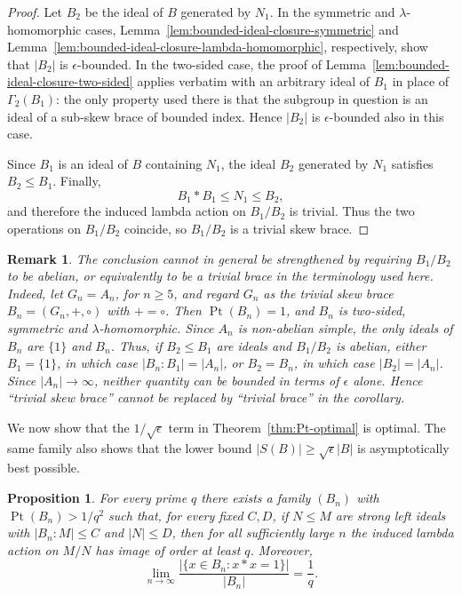 \documentclass[11pt, oneside]{amsart}
\numberwithin{equation}{section}
\theoremstyle{plain}
\newtheorem{pro}[equation]{Proposition}
\newtheorem{rem}[equation]{Remark}
\theoremstyle{definition}
\newcommand{\Pt}{\operatorname{Pt} }
\begin{document}
\begin{proof}
Let $B_2$ be the ideal of $B$ generated by $N_1$. In the symmetric and $\lambda$-homomorphic cases, Lemma~\ref{lem:bounded-ideal-closure-symmetric} and Lemma~\ref{lem:bounded-ideal-closure-lambda-homomorphic}, respectively, show that $|B_2|$ is $\epsilon$-bounded. In the two-sided case, the proof of Lemma~\ref{lem:bounded-ideal-closure-two-sided} applies verbatim with an arbitrary ideal of $B_1$ in place of $\Gamma_2(B_1)$: the only property used there is that the subgroup in question is an ideal of a sub-skew brace of bounded index. Hence $|B_2|$ is $\epsilon$-bounded also in this case.

Since $B_1$ is an ideal of $B$ containing $N_1$, the ideal $B_2$ generated by $N_1$ satisfies $B_2\leqslant B_1$. Finally,
$$
B_1*B_1\leqslant N_1\leqslant B_2,
$$
and therefore the induced lambda action on $B_1/B_2$ is trivial. Thus the two operations on $B_1/B_2$ coincide, so $B_1/B_2$ is a trivial skew brace.
\end{proof}

\begin{rem}
The conclusion cannot in general be strengthened by requiring $B_1/B_2$ to be abelian, or equivalently to be a trivial brace in the terminology used here. Indeed, let $G_n=A_n$, for $n\geqslant5$, and regard $G_n$ as the trivial skew brace $B_n=(G_n,+,\circ)$ with $+=\circ$. Then $\Pt(B_n)=1$, and $B_n$ is two-sided, symmetric and $\lambda$-homomorphic. Since $A_n$ is non-abelian simple, the only ideals of $B_n$ are $\{1\}$ and $B_n$. Thus, if $B_2\leqslant B_1$ are ideals and $B_1/B_2$ is abelian, either $B_1=\{1\}$, in which case $|B_n:B_1|=|A_n|$, or $B_2=B_n$, in which case $|B_2|=|A_n|$. Since $|A_n|\to\infty$, neither quantity can be bounded in terms of $\epsilon$ alone. Hence ``trivial skew brace'' cannot be replaced by ``trivial brace'' in the corollary.
\end{rem}



We now show that the $1/\sqrt{\epsilon}$ term in
Theorem~\ref{thm:Pt-optimal} is optimal. The same family also shows
that the lower bound $|S(B)|\geqslant\sqrt{\epsilon}|B|$ is
asymptotically best possible.

\begin{pro} %
For every prime $q$ there exists a family $(B_n)$ with
$\Pt(B_n)>1/q^2$ such that, for every fixed $C,D$, if
$N\leqslant M$ are strong left ideals with $|B_n:M|\leqslant C$ and
$|N|\leqslant D$, then for all sufficiently large $n$ the induced
lambda action on $M/N$ has image of order at least $q$. Moreover,
$$
\lim_{n\to\infty}
\frac{|\{x\in B_n:x*x= 1\}|}{|B_n|}=\frac1q.
$$
\end{pro}
\end{document}
